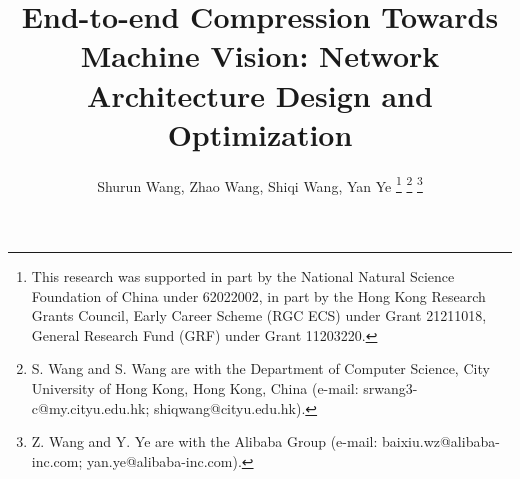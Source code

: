 \documentclass[transmag]{IEEEtran}
\begin{document}
\title{End-to-end Compression Towards Machine Vision: Network Architecture Design and Optimization}

\author{Shurun Wang, Zhao Wang, Shiqi Wang, Yan Ye
\thanks{This research was supported in part by the National Natural Science Foundation of China under 62022002, in part by the Hong Kong Research Grants Council, Early Career Scheme (RGC ECS) under Grant 21211018, General Research Fund (GRF) under Grant 11203220.}
\thanks{S. Wang and S. Wang are with the Department of Computer Science, City University of Hong Kong, Hong Kong, China (e-mail: srwang3-c@my.cityu.edu.hk;  shiqwang@cityu.edu.hk).}
\thanks{Z. Wang and Y. Ye are with the Alibaba Group (e-mail: baixiu.wz@alibaba-inc.com;  yan.ye@alibaba-inc.com).}

}

\iffalse
\IEEEmembership{Member, IEEE}
\thanks{This paragraph of the first footnote will contain the 
date on which you submitted your paper for review. It will also contain 
support information, including sponsor and financial support acknowledgment. 
For example, ``This work was supported in part by the U.S. Department of 
Commerce under Grant BS123456''.}
\thanks{The next few paragraphs should contain 
the authors' current affiliations, including current address and e-mail. For 
example, F. A. Author is with the National Institute of Standards and 
Technology, Boulder, CO 80305 USA (e-mail: author@ boulder.nist.gov).}
\thanks{S. B. Author, Jr., was with Rice University, Houston, TX 77005 USA. He is 
now with the Department of Physics, Colorado State University, Fort Collins, 
CO 80523 USA (e-mail: author@lamar.colostate.edu).}
\thanks{T. C. Author is with 
the Electrical Engineering Department, University of Colorado, Boulder, CO 
80309 USA, on leave from the National Research Institute for Metals, 
Tsukuba, Japan (e-mail: author@nrim.go.jp).}
\fi 
\end{document}
